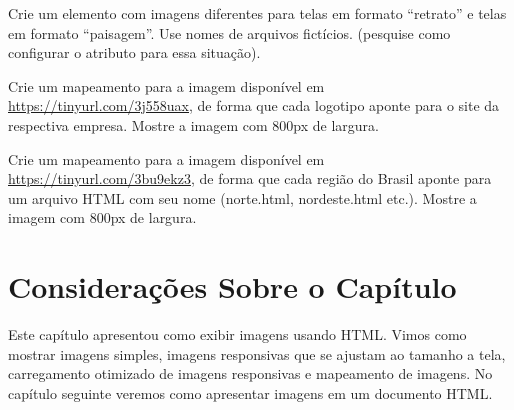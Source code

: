 \begin{exercise}
Crie um elemento  com imagens diferentes para telas em formato ``retrato'' e telas em formato ``paisagem''. Use nomes de arquivos fictícios. (pesquise como configurar o atributo  para essa situação).
\end{exercise}

\begin{exercise}
Crie um mapeamento para a imagem disponível em \url{https://tinyurl.com/3j558uax}, de forma que cada logotipo aponte para o site da respectiva empresa. Mostre a imagem com 800px de largura.
\end{exercise}

\begin{exercise}
Crie um mapeamento para a imagem disponível em \url{https://tinyurl.com/3bu9ekz3}, de forma que cada região do Brasil aponte para um arquivo HTML com seu nome (norte.html, nordeste.html etc.). Mostre a imagem com 800px de largura.
\end{exercise}

\section{Considerações Sobre o Capítulo}

Este capítulo apresentou como exibir imagens usando HTML. Vimos como mostrar imagens simples, imagens responsivas que se ajustam ao tamanho a tela, carregamento otimizado de imagens responsivas e mapeamento de imagens. No capítulo seguinte veremos como apresentar imagens em um documento HTML.